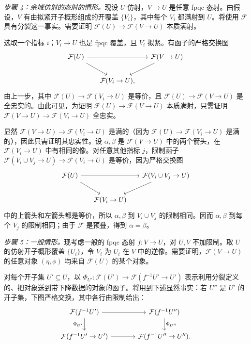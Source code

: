 \emph{步骤 4：余域仿射的态射的情形。}现设 $U$ 仿射，$V\to U$ 是任意 fpqc 态射。由假设，$V$ 有由拟紧开子概形组成的开覆盖 $\{V_i\}$，其中每个 $V_i$ 都满射到 $U$。将使用 $\mathcal F$ 具有分裂这一事实。需要证明 $\mathcal F(U)\to\mathcal F(V\to U)$ 本质满射。

选取一个指标 $i$；$V_i\to U$ 也是 fpqc 覆盖，且 $V_i$ 拟紧。有函子的严格交换图
\[
\begin{tikzcd}[column sep=1.5em]
 \mathcal F(U)\arrow[rr]\arrow[dr]&&\mathcal F(V\to U)\arrow[dl]\\
 &\mathcal F(V_i\to U),
\end{tikzcd}
\]
由上一步，其中 $\mathcal F(U)\to\mathcal F(V_i\to U)$ 是等价，且 $\mathcal F(U)\to\mathcal F(V\to U)$ 是全忠实的。由此可见，为证明 $\mathcal F(U)\to\mathcal F(V\to U)$ 本质满射，只需证明 $\mathcal F(V\to U)\to\mathcal F(V_i\to U)$ 全忠实。

显然 $\mathcal F(V\to U)\to\mathcal F(V_i\to U)$ 是满的（因为 $\mathcal F(U)\to\mathcal F(V_i\to U)$ 是满的），因此只需证明其忠实性。设 $\alpha,\beta$ 是 $\mathcal F(V\to U)$ 中的两个箭头，在 $\mathcal F(V_i\to U)$ 中有相同的像。对任意其他指标 $j$，限制函子 $\mathcal F(V_i\cup V_j\to U)\to\mathcal F(V_i\to U)$ 是等价，因为严格交换图
\[
\begin{tikzcd}[column sep=1.5em]
 \mathcal F(U)\arrow[rr]\arrow[dr]&&\mathcal F(V_i\cup V_j\to U)\arrow[dl]\\
 &\mathcal F(V_i\to U)
\end{tikzcd}
\]
中的上箭头和左箭头都是等价，所以 $\alpha,\beta$ 到 $V_i\cup V_j$ 的限制相同。因而 $\alpha,\beta$ 到每个 $V_j$ 的限制相同；由于 $\mathcal F$ 是预叠，得到 $\alpha=\beta$。

\emph{步骤 5：一般情形。}现考虑一般的 fpqc 态射 $f\colon V\to U$，对 $U,V$ 不加限制。取 $U$ 的仿射开子概形覆盖 $\{U_i\}$，令 $V_i$ 为 $U_i$ 在 $V$ 中的逆像。需要证明，$\mathcal F(V\to U)$ 的任意对象 $(\eta,\phi)$ 均来自 $\mathcal F(U)$ 的某个对象。

对每个开子集 $U'\subseteq U$，以 $\Phi_{U'}\colon\mathcal F(U')\to\mathcal F(f^{-1}U'\to U')$ 表示利用分裂定义的、把对象送到带下降数据的对象的函子。将用到下述显然事实：若 $U''$ 是 $U'$ 的开子集，下图严格交换，其中各行由限制给出：
\[
\begin{tikzcd}[column sep=large]
 \mathcal F(f^{-1}U')\arrow[r]\arrow[d,"{\Phi_{U'}}"']&\mathcal F(f^{-1}U'')\arrow[d,"{\Phi_{U''}}"]\\
 \mathcal F(f^{-1}U'\to U')\arrow[r]&\mathcal F(f^{-1}U''\to U'').
\end{tikzcd}
\]

